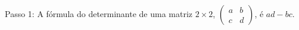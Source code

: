 \documentclass[preview]{standalone}
\begin{document}
\begin{center}
Passo 1: A fórmula do determinante de uma matriz \( 2 \times 2 \), \( \begin{pmatrix} a & b \\ c & d \end{pmatrix} \), é \( ad - bc \).
\end{center}
\end{document}
